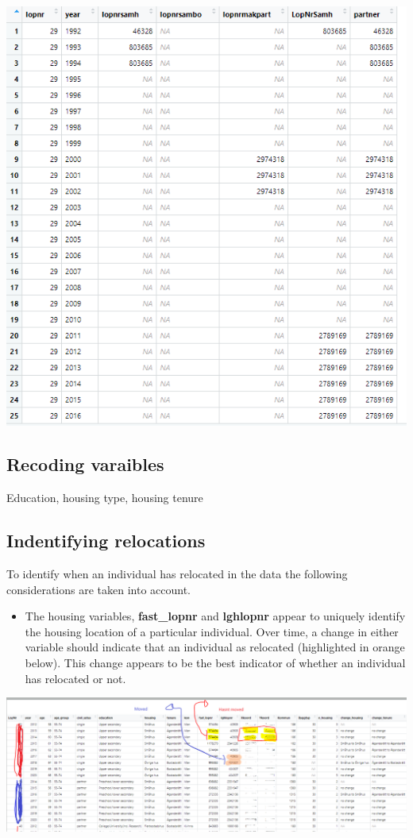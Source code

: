 \documentclass[
]{book}
\providecommand{\tightlist}{%
  \setlength{\itemsep}{0pt}\setlength{\parskip}{0pt}}
\begin{document}
\includegraphics[width=0.8\linewidth]{output/figures/partners_png}

\hypertarget{recoding-varaibles}{%
\subsection{Recoding varaibles}\label{recoding-varaibles}}

Education, housing type, housing tenure

\hypertarget{indentifying-relocations}{%
\subsection{Indentifying relocations}\label{indentifying-relocations}}

To identify when an individual has relocated in the data the following considerations are taken into account.

\begin{itemize}
\tightlist
\item
  The housing variables, \textbf{fast\_lopnr} and \textbf{lghlopnr} appear to uniquely identify the housing location of a particular individual. Over time, a change in either variable should indicate that an individual as relocated (highlighted in orange below). This change appears to be the best indicator of whether an individual has relocated or not.
\end{itemize}

\includegraphics[width=1\linewidth]{output/figures/relocation_id}
\end{document}
